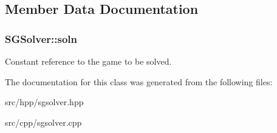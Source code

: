 \subsection{Member Data Documentation}
\hypertarget{classSGSolver_ac2b29f9d4f8a5fde16e07c68c349367c}{
\subsubsection[{soln}]{ S\-G\-Solver\-::soln\hspace{0.3cm}{\ttfamily [private]}}}\label{classSGSolver_ac2b29f9d4f8a5fde16e07c68c349367c}
Constant reference to the game to be solved. 

The documentation for this class was generated from the following files\-:\begin{DoxyCompactItemize}
\item 
src/hpp/sgsolver.\-hpp\item 
src/cpp/sgsolver.\-cpp\end{DoxyCompactItemize}
